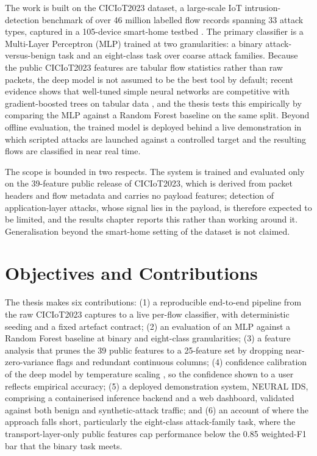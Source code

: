\par The work is built on the CICIoT2023 dataset, a large-scale IoT intrusion-detection benchmark of over 46 million labelled flow records spanning 33 attack types, captured in a 105-device smart-home testbed \cite{CICIoT2023}. The primary classifier is a Multi-Layer Perceptron (MLP) trained at two granularities: a binary attack-versus-benign task and an eight-class task over coarse attack families. Because the public CICIoT2023 features are tabular flow statistics rather than raw packets, the deep model is not assumed to be the best tool by default; recent evidence shows that well-tuned simple neural networks are competitive with gradient-boosted trees on tabular data \cite{Kadra2021}, and the thesis tests this empirically by comparing the MLP against a Random Forest baseline on the same split. Beyond offline evaluation, the trained model is deployed behind a live demonstration in which scripted attacks are launched against a controlled target and the resulting flows are classified in near real time.

\par The scope is bounded in two respects. The system is trained and evaluated only on the 39-feature public release of CICIoT2023, which is derived from packet headers and flow metadata and carries no payload features; detection of application-layer attacks, whose signal lies in the payload, is therefore expected to be limited, and the results chapter reports this rather than working around it. Generalisation beyond the smart-home setting of the dataset is not claimed.

\section{Objectives and Contributions}
\label{sec:intro_contributions}

\par The thesis makes six contributions: (1) a reproducible end-to-end pipeline from the raw CICIoT2023 captures to a live per-flow classifier, with deterministic seeding and a fixed artefact contract; (2) an evaluation of an MLP against a Random Forest baseline at binary and eight-class granularities; (3) a feature analysis that prunes the 39 public features to a 25-feature set by dropping near-zero-variance flags and redundant continuous columns; (4) confidence calibration of the deep model by temperature scaling \cite{Guo2017}, so the confidence shown to a user reflects empirical accuracy; (5) a deployed demonstration system, NEURAL IDS, comprising a containerised inference backend and a web dashboard, validated against both benign and synthetic-attack traffic; and (6) an account of where the approach falls short, particularly the eight-class attack-family task, where the transport-layer-only public features cap performance below the 0.85 weighted-F1 bar that the binary task meets.

